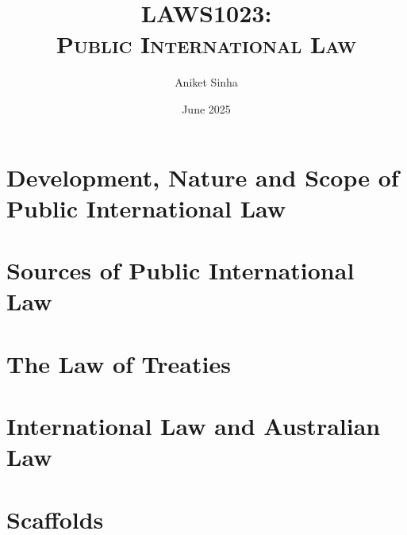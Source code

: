 \documentclass[oneside, 12pt]{book}
\title{\Huge\bfseries\scshape LAWS1023: \\ Public International Law}
\author{Aniket Sinha}
\date{June 2025}
\begin{document}
\maketitle

\frontmatter

\tableofcontents



\flushleft

\mainmatter

\chapter{Development, Nature and Scope of Public International Law}


\chapter{Sources of Public International Law}


\chapter{The Law of Treaties}


\chapter{International Law and Australian Law}


\appendix
\chapter{Scaffolds}

\end{document}
